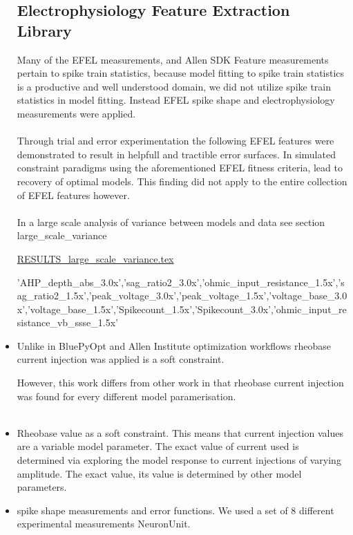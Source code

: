 \begin{itemize}
\subsection{Electrophysiology Feature Extraction Library}

Many of the EFEL measurements, and Allen SDK Feature measurements pertain to spike train statistics, because model fitting to spike train statistics is a productive and well understood domain, we did not utilize spike train statistics in model fitting. Instead EFEL spike shape and electrophysiology measurements were applied.\\
\\
Through trial and error experimentation the following EFEL features were demonstrated to result in helpfull and tractible error surfaces. In simulated constraint paradigms using the aforementioned EFEL fitness criteria, lead to recovery of optimal models. This finding did not apply to the entire collection of EFEL features however.\\
\\
In a large scale analysis of variance between models and data see section large_scale_variance

\href{run:./RESULTS_large_scale_variance.tex}{RESULTS_large_scale_variance.tex}



'AHP_depth_abs_3.0x','sag_ratio2_3.0x','ohmic_input_resistance_1.5x','sag_ratio2_1.5x','peak_voltage_3.0x','peak_voltage_1.5x','voltage_base_3.0x','voltage_base_1.5x','Spikecount_1.5x','Spikecount_3.0x','ohmic_input_resistance_vb_ssse_1.5x'


\item Unlike in BluePyOpt \cite{Werner} and Allen Institute optimization workflows \cite{gouwens} rheobase current injection was applied is a soft constraint. 

However, this work differs from other work in that rheobase current injection was found for every different model paramerisation.\\
\\
\item Rheobase value as a soft constraint. This means that current injection values are a variable model parameter. The exact value of current used is determined via exploring the model response to current injections of varying amplitude. The exact value, its value is determined by other model parameters.

\item spike shape measurements and error functions. We used a set of 8 different experimental measurements NeuronUnit.
\end{itemize}



